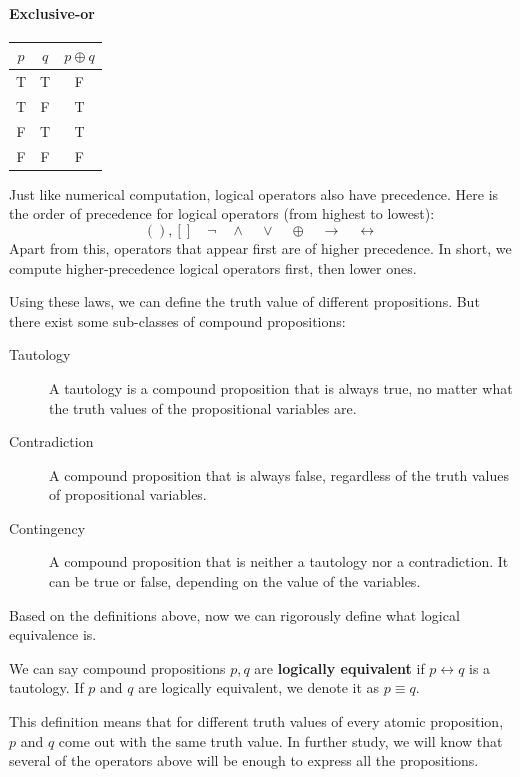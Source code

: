 \documentclass[oneside]{book}
\begin{document}
\paragraph{Exclusive-or}
\begin{center}
\begin{tabular}{cc|c}
\toprule
$p$ & $q$ & $p \oplus q$ \\
\midrule
T & T & F \\
T & F & T \\
F & T & T \\
F & F & F \\
\bottomrule
\end{tabular}
\end{center}

Just like numerical computation, logical operators also have precedence. Here is the order of precedence for logical operators (from highest to lowest):
$$ ( ), [ ] \quad \neg \quad \wedge \quad \vee \quad \oplus \quad \to \quad \leftrightarrow $$
Apart from this, operators that appear first are of higher precedence. In short, we compute higher-precedence logical operators first, then lower ones.

Using these laws, we can define the truth value of different propositions. But there exist some sub-classes of compound propositions:
\begin{description}
    \item[Tautology] A tautology is a compound proposition that is always true, no matter what the truth values of the propositional variables are.
    \item[Contradiction] A compound proposition that is always false, regardless of the truth values of propositional variables.
    \item[Contingency] A compound proposition that is neither a tautology nor a contradiction. It can be true or false, depending on the value of the variables.
\end{description}

Based on the definitions above, now we can rigorously define what logical equivalence is.

\begin{definition}
We can say compound propositions $p, q$ are \textbf{logically equivalent} if $p \leftrightarrow q$ is a tautology. If $p$ and $q$ are logically equivalent, we denote it as $p \equiv q$.
\end{definition}

This definition means that for different truth values of every atomic proposition, $p$ and $q$ come out with the same truth value. In further study, we will know that several of the operators above will be enough to express all the propositions.
\end{document}
